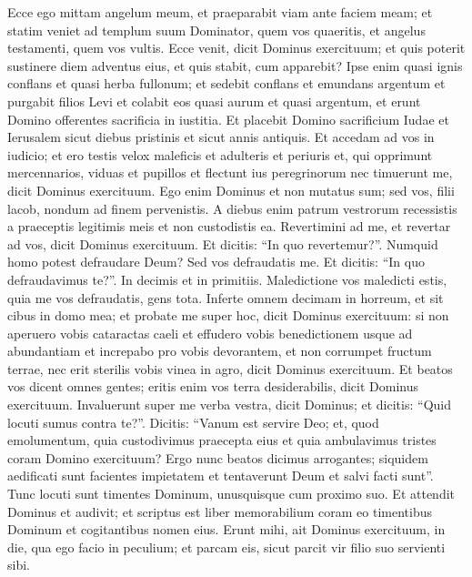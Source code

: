 \begin{biblechapter}  
\verse Ecce ego mittam angelum meum, et praeparabit viam ante faciem meam; et statim veniet ad templum suum Dominator, quem vos quaeritis, et angelus testamenti, quem vos vultis. Ecce venit, dicit Dominus exercituum; 
\verse et quis poterit sustinere diem adventus eius, et quis stabit, cum apparebit? Ipse enim quasi ignis conflans et quasi herba fullonum; 
\verse et sedebit conflans et emundans argentum et purgabit filios Levi et colabit eos quasi aurum et quasi argentum, et erunt Domino offerentes sacrificia in iustitia. 
\verse Et placebit Domino sacrificium Iudae et Ierusalem sicut diebus pristinis et sicut annis antiquis. 
\verse Et accedam ad vos in iudicio; et ero testis velox maleficis et adulteris et periuris et, qui opprimunt mercennarios, viduas et pupillos et flectunt ius peregrinorum nec timuerunt me, dicit Dominus exercituum. 
\verse Ego enim Dominus et non mutatus sum; sed vos, filii lacob, nondum ad finem pervenistis. 
\verse A diebus enim patrum vestrorum recessistis a praeceptis legitimis meis et non custodistis ea. Revertimini ad me, et revertar ad vos, dicit Dominus exercituum. Et dicitis: “In quo revertemur?”. 
\verse Numquid homo potest defraudare Deum? Sed vos defraudatis me. Et dicitis: “In quo defraudavimus te?”. In decimis et in primitiis. 
\verse Maledictione vos maledicti estis, quia me vos defraudatis, gens tota. 
\verse Inferte omnem decimam in horreum, et sit cibus in domo mea; et probate me super hoc, dicit Dominus exercituum: si non aperuero vobis cataractas caeli et effudero vobis benedictionem usque ad abundantiam 
\verse et increpabo pro vobis devorantem, et non corrumpet fructum terrae, nec erit sterilis vobis vinea in agro, dicit Dominus exercituum. 
\verse Et beatos vos dicent omnes gentes; eritis enim vos terra desiderabilis, dicit Dominus exercituum. 
\verse Invaluerunt super me verba vestra, dicit Dominus; 
\verse et dicitis: “Quid locuti sumus contra te?”. Dicitis: “Vanum est servire Deo; et, quod emolumentum, quia custodivimus praecepta eius et quia ambulavimus tristes coram Domino exercituum? 
\verse Ergo nunc beatos dicimus arrogantes; siquidem aedificati sunt facientes impietatem et tentaverunt Deum et salvi facti sunt”. 
\verse Tunc locuti sunt timentes Dominum, unusquisque cum proximo suo. Et attendit Dominus et audivit; et scriptus est liber memorabilium coram eo timentibus Dominum et cogitantibus nomen eius. 
\verse Erunt mihi, ait Dominus exercituum, in die, qua ego facio in peculium; et parcam eis, sicut parcit vir filio suo servienti sibi.  

\end{biblechapter}
